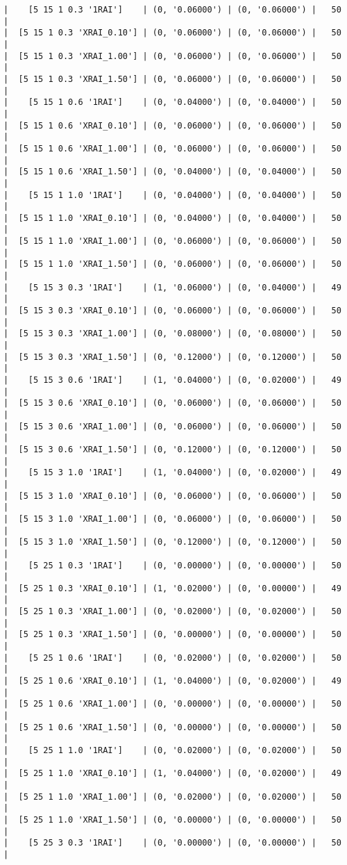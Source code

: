 \documentclass{article}
\begin{document}
\begin{verbatim}
|    [5 15 1 0.3 '1RAI']    | (0, '0.06000') | (0, '0.06000') |   50  |
|  [5 15 1 0.3 'XRAI_0.10'] | (0, '0.06000') | (0, '0.06000') |   50  |
|  [5 15 1 0.3 'XRAI_1.00'] | (0, '0.06000') | (0, '0.06000') |   50  |
|  [5 15 1 0.3 'XRAI_1.50'] | (0, '0.06000') | (0, '0.06000') |   50  |
|    [5 15 1 0.6 '1RAI']    | (0, '0.04000') | (0, '0.04000') |   50  |
|  [5 15 1 0.6 'XRAI_0.10'] | (0, '0.06000') | (0, '0.06000') |   50  |
|  [5 15 1 0.6 'XRAI_1.00'] | (0, '0.06000') | (0, '0.06000') |   50  |
|  [5 15 1 0.6 'XRAI_1.50'] | (0, '0.04000') | (0, '0.04000') |   50  |
|    [5 15 1 1.0 '1RAI']    | (0, '0.04000') | (0, '0.04000') |   50  |
|  [5 15 1 1.0 'XRAI_0.10'] | (0, '0.04000') | (0, '0.04000') |   50  |
|  [5 15 1 1.0 'XRAI_1.00'] | (0, '0.06000') | (0, '0.06000') |   50  |
|  [5 15 1 1.0 'XRAI_1.50'] | (0, '0.06000') | (0, '0.06000') |   50  |
|    [5 15 3 0.3 '1RAI']    | (1, '0.06000') | (0, '0.04000') |   49  |
|  [5 15 3 0.3 'XRAI_0.10'] | (0, '0.06000') | (0, '0.06000') |   50  |
|  [5 15 3 0.3 'XRAI_1.00'] | (0, '0.08000') | (0, '0.08000') |   50  |
|  [5 15 3 0.3 'XRAI_1.50'] | (0, '0.12000') | (0, '0.12000') |   50  |
|    [5 15 3 0.6 '1RAI']    | (1, '0.04000') | (0, '0.02000') |   49  |
|  [5 15 3 0.6 'XRAI_0.10'] | (0, '0.06000') | (0, '0.06000') |   50  |
|  [5 15 3 0.6 'XRAI_1.00'] | (0, '0.06000') | (0, '0.06000') |   50  |
|  [5 15 3 0.6 'XRAI_1.50'] | (0, '0.12000') | (0, '0.12000') |   50  |
|    [5 15 3 1.0 '1RAI']    | (1, '0.04000') | (0, '0.02000') |   49  |
|  [5 15 3 1.0 'XRAI_0.10'] | (0, '0.06000') | (0, '0.06000') |   50  |
|  [5 15 3 1.0 'XRAI_1.00'] | (0, '0.06000') | (0, '0.06000') |   50  |
|  [5 15 3 1.0 'XRAI_1.50'] | (0, '0.12000') | (0, '0.12000') |   50  |
|    [5 25 1 0.3 '1RAI']    | (0, '0.00000') | (0, '0.00000') |   50  |
|  [5 25 1 0.3 'XRAI_0.10'] | (1, '0.02000') | (0, '0.00000') |   49  |
|  [5 25 1 0.3 'XRAI_1.00'] | (0, '0.02000') | (0, '0.02000') |   50  |
|  [5 25 1 0.3 'XRAI_1.50'] | (0, '0.00000') | (0, '0.00000') |   50  |
|    [5 25 1 0.6 '1RAI']    | (0, '0.02000') | (0, '0.02000') |   50  |
|  [5 25 1 0.6 'XRAI_0.10'] | (1, '0.04000') | (0, '0.02000') |   49  |
|  [5 25 1 0.6 'XRAI_1.00'] | (0, '0.00000') | (0, '0.00000') |   50  |
|  [5 25 1 0.6 'XRAI_1.50'] | (0, '0.00000') | (0, '0.00000') |   50  |
|    [5 25 1 1.0 '1RAI']    | (0, '0.02000') | (0, '0.02000') |   50  |
|  [5 25 1 1.0 'XRAI_0.10'] | (1, '0.04000') | (0, '0.02000') |   49  |
|  [5 25 1 1.0 'XRAI_1.00'] | (0, '0.02000') | (0, '0.02000') |   50  |
|  [5 25 1 1.0 'XRAI_1.50'] | (0, '0.00000') | (0, '0.00000') |   50  |
|    [5 25 3 0.3 '1RAI']    | (0, '0.00000') | (0, '0.00000') |   50  |

\end{verbatim}
\end{document}
